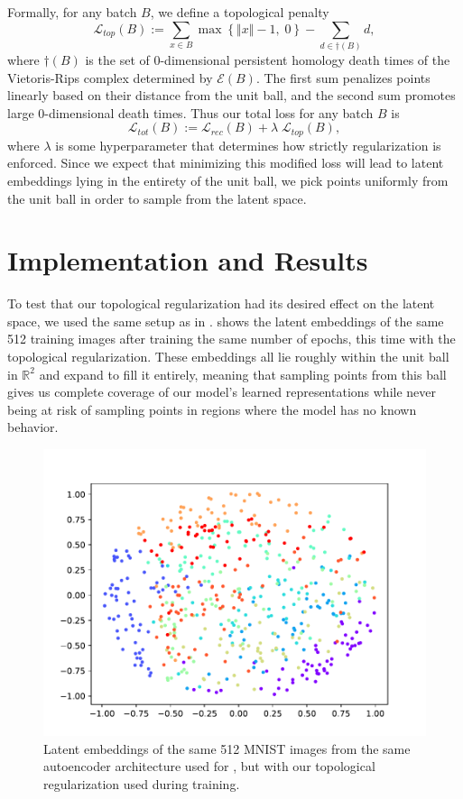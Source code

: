 \documentclass[conference]{IEEEtran}
\newcommand{\R}{\mathbb{R}}
\begin{document}
Formally, for any batch $B$, we define a topological penalty
\[
	\mathcal{L}_{top}(B) :=  \sum_{x \in B} \max\left\{ {\Vert{x}\Vert}-1, \;0 \right\} - \sum_{d \in \dagger(B)} d,
\]
where $\dagger(B)$ is the set of 0-dimensional persistent homology death times of the Vietoris-Rips complex determined by $\mathcal{E}(B)$. The first sum penalizes points linearly based on their distance from the unit ball, and the second sum promotes large 0-dimensional death times. Thus our total loss for any batch $B$ is
\[
	\mathcal{L}_{tot}(B) := \mathcal{L}_{rec}(B) + \lambda \; \mathcal{L}_{top}(B),
\] where $\lambda$ is some hyperparameter that determines how strictly regularization is enforced. Since we expect that minimizing this modified loss will lead to latent embeddings lying in the entirety of the unit ball, we pick points uniformly from the unit ball in order to sample from the latent space.

\section{Implementation and Results}

To test that our topological regularization had its desired effect on the latent space, we used the same setup as in .  shows the latent embeddings of the same 512 training images after training the same number of epochs, this time with the topological regularization. These embeddings all lie roughly within the unit ball in $\R^2$ and expand to fill it entirely, meaning that sampling points from this ball gives us complete coverage of our model's learned representations while never being at risk of sampling points in regions where the model has no known behavior.

\begin{figure}[H]
	\centering
	\includegraphics[scale=0.5]{fig/good-latent.pdf}
	\caption{Latent embeddings of the same 512 MNIST images from the same autoencoder architecture used for , but with our topological regularization used during training.}
	\label{good-latent}
\end{figure}
\end{document}
